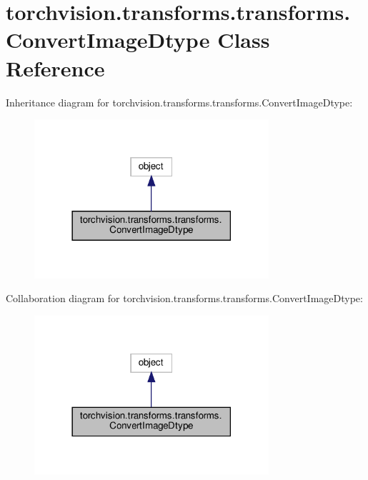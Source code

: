 \hypertarget{classtorchvision_1_1transforms_1_1transforms_1_1ConvertImageDtype}{}\section{torchvision.\+transforms.\+transforms.\+Convert\+Image\+Dtype Class Reference}
\label{classtorchvision_1_1transforms_1_1transforms_1_1ConvertImageDtype}


Inheritance diagram for torchvision.\+transforms.\+transforms.\+Convert\+Image\+Dtype\+:
\nopagebreak
\begin{figure}[H]
\begin{center}
\leavevmode
\includegraphics[width=246pt]{classtorchvision_1_1transforms_1_1transforms_1_1ConvertImageDtype__inherit__graph}
\end{center}
\end{figure}


Collaboration diagram for torchvision.\+transforms.\+transforms.\+Convert\+Image\+Dtype\+:
\nopagebreak
\begin{figure}[H]
\begin{center}
\leavevmode
\includegraphics[width=246pt]{classtorchvision_1_1transforms_1_1transforms_1_1ConvertImageDtype__coll__graph}
\end{center}
\end{figure}
